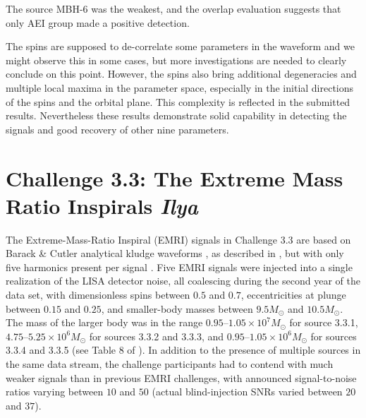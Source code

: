 \documentclass{iopart}
\begin{document}
The source MBH-6 was the weakest, and the overlap evaluation suggests that only AEI group made a positive detection. 

The spins are supposed to de-correlate some parameters in the waveform \cite{SpinBBHLangHugues} and we 
might observe this in some cases, but more investigations are needed to clearly conclude on this point.
However, the spins also bring additional degeneracies and multiple local maxima in the parameter space, especially in the initial directions of the spins and the orbital plane. This complexity is reflected in the submitted results.
Nevertheless these results demonstrate solid capability in detecting the signals and good recovery of other 
nine parameters. 




\section{Challenge 3.3: The Extreme Mass Ratio Inspirals {\it Ilya}}

The Extreme-Mass-Ratio Inspiral (EMRI) signals in Challenge 3.3 are based on Barack \& Cutler analytical kludge waveforms \cite{barackcutler}, as described in \cite{mldcgwdaw2}, but with only five harmonics present per signal \cite{MLDC3}.  Five EMRI signals were injected into a single realization of the LISA detector noise, all coalescing during the second year of the data set, with dimensionless spins between $0.5$ and $0.7$, eccentricities at plunge between $0.15$ and $0.25$, and smaller-body masses between $9.5 M_\odot$ and $10.5 M_\odot$.  The mass of the larger body was in the range $0.95$--$1.05\times10^7 M_\odot$ for source 3.3.1,  $4.75$--$5.25 \times10^6 M_\odot$ for sources 3.3.2 and 3.3.3, and $0.95$--$1.05\times10^6 M_\odot$ for sources 3.3.4 and 3.3.5 (see Table 8 of \cite{MLDC3}).  In addition to the presence of multiple sources in the same data stream, the challenge participants had to contend with much weaker signals than in previous EMRI challenges, with announced signal-to-noise ratios varying between $10$ and $50$ (actual blind-injection SNRs varied between $20$ and $37$).
\end{document}
